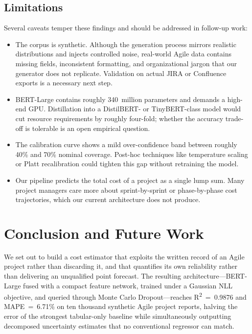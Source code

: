 \documentclass[conference]{IEEEtran}
\begin{document}
\subsection{Limitations}

Several caveats temper these findings and should be addressed in follow-up work:

\begin{itemize}
    \item The corpus is synthetic. Although the generation process mirrors realistic distributions and injects controlled noise, real-world Agile data contains missing fields, inconsistent formatting, and organizational jargon that our generator does not replicate. Validation on actual JIRA or Confluence exports is a necessary next step.
    \item BERT-Large contains roughly 340~million parameters and demands a high-end GPU. Distillation into a DistilBERT- or TinyBERT-class model would cut resource requirements by roughly four-fold; whether the accuracy trade-off is tolerable is an open empirical question.
    \item The calibration curve shows a mild over-confidence band between roughly 40\% and 70\% nominal coverage. Post-hoc techniques like temperature scaling or Platt recalibration could tighten this gap without retraining the model.
    \item Our pipeline predicts the total cost of a project as a single lump sum. Many project managers care more about sprint-by-sprint or phase-by-phase cost trajectories, which our current architecture does not produce.
\end{itemize}

\section{Conclusion and Future Work}

We set out to build a cost estimator that exploits the written record of an Agile project rather than discarding it, and that quantifies its own reliability rather than delivering an unqualified point forecast. The resulting architecture---BERT-Large fused with a compact feature network, trained under a Gaussian NLL objective, and queried through Monte Carlo Dropout---reaches R\textsuperscript{2}~=~0.9876 and MAPE~=~6.71\% on ten thousand synthetic Agile project reports, halving the error of the strongest tabular-only baseline while simultaneously outputting decomposed uncertainty estimates that no conventional regressor can match.
\end{document}
